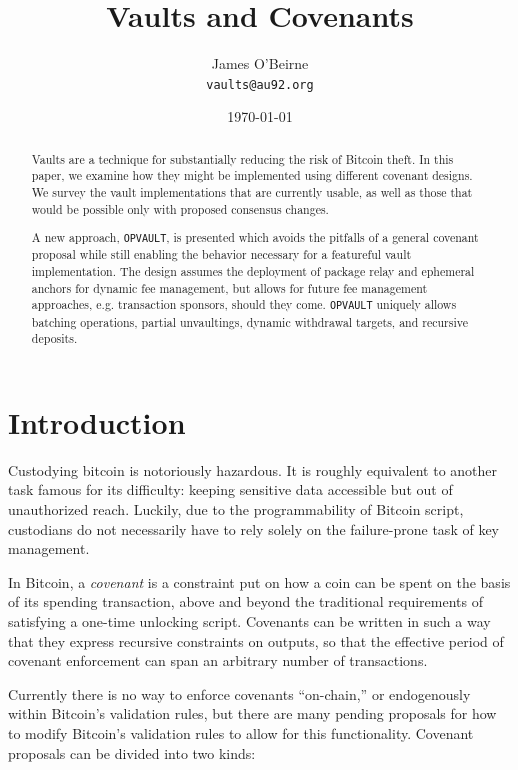 \documentclass[10pt]{article}
\author{James O'Beirne \\
  \texttt{vaults@au92.org}
}
\date{\today}
\title{Vaults and Covenants}
\begin{document}
\newcommand{\ctv}{\texttt{OP\textunderscore{}CHECKTEMPLATEVERIFY}}
\newcommand{\opv}{\texttt{OP\textunderscore{}VAULT}}
\newcommand{\opuv}{\texttt{OP\textunderscore{}UNVAULT}}
\newcommand{\spk}{\code{scriptPubKey}}
\newcommand{\code}[1]{\texttt{#1}}


\maketitle
\begin{abstract}

  Vaults are a technique for substantially reducing the risk of Bitcoin theft. In this
  paper, we examine how they might be implemented using different covenant designs. We
  survey the vault implementations that are currently usable, as well as those that
  would be possible only with proposed consensus changes. 

  A new approach, \opv{}, is presented which avoids the pitfalls of a general covenant
  proposal while still enabling the behavior necessary for a featureful vault
  implementation. The design assumes the deployment of package relay and ephemeral
  anchors for dynamic fee management, but allows for future fee management approaches,
  e.g. transaction sponsors, should they come. \opv{} uniquely allows batching operations,
  partial unvaultings, dynamic withdrawal targets, and recursive deposits.

\end{abstract}

\section*{Introduction}

Custodying bitcoin is notoriously hazardous. It is roughly equivalent to
another task famous for its difficulty: keeping sensitive data accessible but out
of unauthorized reach. Luckily, due to the programmability of Bitcoin script,
custodians do not necessarily have to rely solely on the failure-prone task of key
management.

In Bitcoin, a \emph{covenant} is a constraint put on how a coin can be spent on the
basis of its spending transaction, above and beyond the traditional
requirements of satisfying a one-time unlocking script. Covenants can be written in
such a way that they express recursive constraints on outputs, so that the effective
period of covenant enforcement can span an arbitrary number of transactions. 

Currently there is no way to enforce covenants ``on-chain,'' or endogenously within
Bitcoin's validation rules, but there are many pending proposals for how to modify
Bitcoin's validation rules to allow for this functionality. Covenant proposals can be
divided into two kinds:
\end{document}
